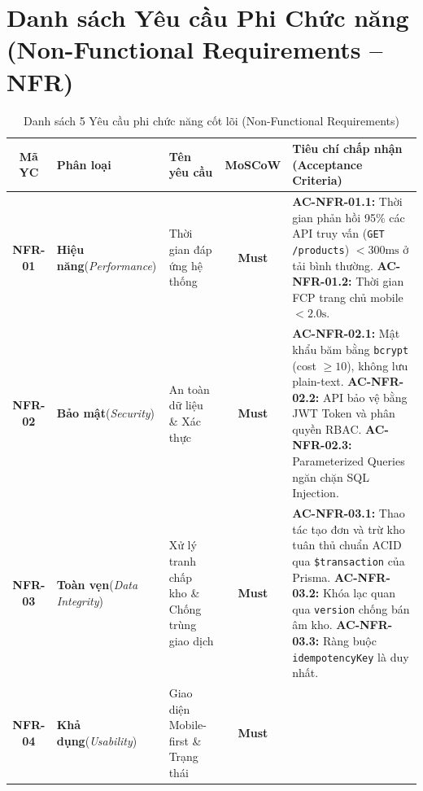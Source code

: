 \documentclass[12pt,a4paper]{article}
\begin{document}
\newpage

\section{Danh sách Yêu cầu Phi Chức năng (Non-Functional Requirements -- NFR)}

\begin{table}[H]
\centering
\caption{Danh sách 5 Yêu cầu phi chức năng cốt lõi (Non-Functional Requirements)}
\label{tab:nfr}
\vspace{0.2cm}
\small
\renewcommand{\arraystretch}{1.3}
\begin{tabularx}{\textwidth}{|c|>{\raggedright\arraybackslash}p{2.8cm}|>{\raggedright\arraybackslash}p{4cm}|c|>{\raggedright\arraybackslash}X|}
\hline
\rowcolor{tableheader}
\textbf{Mã YC} & \textbf{Phân loại} & \textbf{Tên yêu cầu} & \textbf{MoSCoW} & \textbf{Tiêu chí chấp nhận (Acceptance Criteria)} \\
\hline
\textbf{NFR-01} & \textbf{Hiệu năng}\newline(\textit{Performance}) & Thời gian đáp ứng hệ thống & \textbf{Must} & 
\textbf{AC-NFR-01.1:} Thời gian phản hồi 95\% các API truy vấn (\texttt{GET /products}) $< 300\text{ms}$ ở tải bình thường.\newline
\textbf{AC-NFR-01.2:} Thời gian FCP trang chủ mobile $< 2.0\text{s}$. \\
\hline
\textbf{NFR-02} & \textbf{Bảo mật}\newline(\textit{Security}) & An toàn dữ liệu \& Xác thực & \textbf{Must} & 
\textbf{AC-NFR-02.1:} Mật khẩu băm bằng \texttt{bcrypt} (cost $\ge 10$), không lưu plain-text.\newline
\textbf{AC-NFR-02.2:} API bảo vệ bằng JWT Token và phân quyền RBAC.\newline
\textbf{AC-NFR-02.3:} Parameterized Queries ngăn chặn SQL Injection. \\
\hline
\textbf{NFR-03} & \textbf{Toàn vẹn}\newline(\textit{Data Integrity}) & Xử lý tranh chấp kho \& Chống trùng giao dịch & \textbf{Must} & 
\textbf{AC-NFR-03.1:} Thao tác tạo đơn và trừ kho tuân thủ chuẩn ACID qua \texttt{\$transaction} của Prisma.\newline
\textbf{AC-NFR-03.2:} Khóa lạc quan qua \texttt{version} chống bán âm kho.\newline
\textbf{AC-NFR-03.3:} Ràng buộc \texttt{idempotencyKey} là duy nhất. \\
\hline
\textbf{NFR-04} & \textbf{Khả dụng}\newline(\textit{Usability}) & Giao diện Mobile-first \& Trạng thái & \textbf{Must} & 

\end{tabularx}
\end{table}
\end{document}
